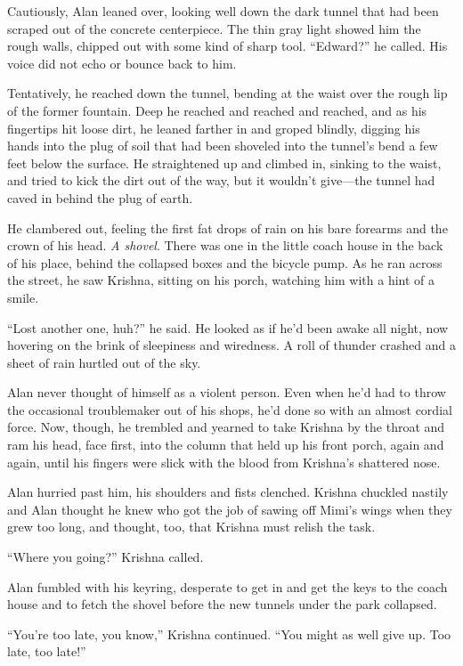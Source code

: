 Cautiously, Alan leaned over, looking well down the dark tunnel that
had been scraped out of the concrete centerpiece.  The thin gray light
showed him the rough walls, chipped out with some kind of sharp tool. 
``Edward?'' he called.  His voice did not echo or bounce back to him.

Tentatively, he reached down the tunnel, bending at the waist over the
rough lip of the former fountain.  Deep he reached and reached and
reached, and as his fingertips hit loose dirt, he leaned farther in
and groped blindly, digging his hands into the plug of soil that had
been shoveled into the tunnel's bend a few feet below the surface.  He
straightened up and climbed in, sinking to the waist, and tried to
kick the dirt out of the way, but it wouldn't give---the tunnel had
caved in behind the plug of earth.

He clambered out, feeling the first fat drops of rain on his bare
forearms and the crown of his head.  \textit{A shovel}.  There was one
in the little coach house in the back of his place, behind the
collapsed boxes and the bicycle pump.  As he ran across the street, he
saw Krishna, sitting on his porch, watching him with a hint of a
smile.

``Lost another one, huh?'' he said.  He looked as if he'd been awake
all night, now hovering on the brink of sleepiness and wiredness.  A
roll of thunder crashed and a sheet of rain hurtled out of the sky.

Alan never thought of himself as a violent person.  Even when he'd had
to throw the occasional troublemaker out of his shops, he'd done so
with an almost cordial force.  Now, though, he trembled and yearned to
take Krishna by the throat and ram his head, face first, into the
column that held up his front porch, again and again, until his
fingers were slick with the blood from Krishna's shattered nose.

Alan hurried past him, his shoulders and fists clenched.  Krishna
chuckled nastily and Alan thought he knew who got the job of sawing
off Mimi's wings when they grew too long, and thought, too, that
Krishna must relish the task.

``Where you going?'' Krishna called.

Alan fumbled with his keyring, desperate to get in and get the keys to
the coach house and to fetch the shovel before the new tunnels under
the park collapsed.

``You're too late, you know,'' Krishna continued.  ``You might as well
give up.  Too late, too late!''

